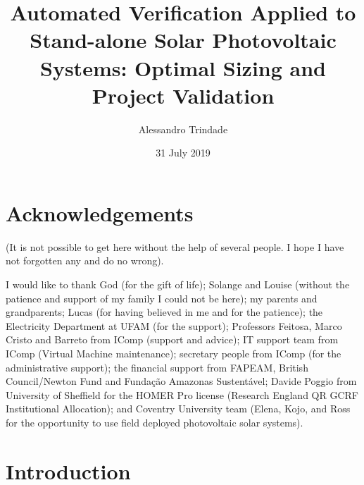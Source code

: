 \documentclass[12pt,twoside]{report}
\title{Automated Verification Applied to Stand-alone Solar Photovoltaic Systems: Optimal Sizing and Project Validation}
\author{Alessandro Trindade}
\date{31 July 2019}
\renewcommand{\headrulewidth}{0.4pt}
\renewcommand{\footrulewidth}{0.4pt}
\begin{document}



\thispagestyle{empty}


\newpage 


\pagestyle{empty}
\newpage



%
%
\chapter*{Acknowledgements}
(It is not possible to get here without the help of several people. I hope I have not forgotten any and do no wrong).

I would like to thank God (for the gift of life); Solange and Louise (without the patience and support of my family I could not be here); my parents and grandparents; Lucas (for having believed in me and for the patience); the Electricity Department at UFAM (for the support); Professors Feitosa, Marco Cristo and Barreto from IComp (support and advice); IT support team from IComp (Virtual Machine maintenance); secretary people from IComp (for the administrative support); the financial support from FAPEAM, British Council/Newton Fund and Fundação Amazonas Sustentável; Davide Poggio from University of Sheffield for the HOMER Pro license (Research England QR GCRF Institutional Allocation); and Coventry University team (Elena, Kojo, and Ross for the opportunity to use field deployed photovoltaic solar systems).

\pagestyle{empty}

\tableofcontents

\listoffigures

\listoftables
\newpage 


\chapter{Introduction}
\pagestyle{fancy}
\fancyhead{}
\fancyfoot{}
\fancyfoot[LE,RO]{\thepage}
\renewcommand{\headrulewidth}{0.4pt}
\renewcommand{\footrulewidth}{0.4pt}

\end{document}
